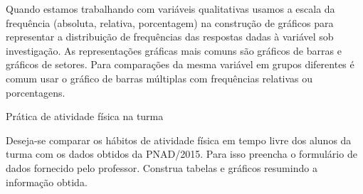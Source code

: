 \begin{observation}

Quando estamos trabalhando com variáveis qualitativas usamos a escala da frequência (absoluta, relativa, porcentagem)  na construção de gráficos para representar a distribuição de frequências das respostas dadas à variável sob investigação. As representações gráficas mais comuns são gráficos de barras e gráficos de setores. Para comparações da mesma variável em grupos diferentes é comum usar o gráfico de barras múltiplas com frequências relativas ou porcentagens.
\end{observation}

\practice{ }
\label{\detokenize{PE103-2::doc}}\label{\detokenize{PE103-2:praticando}}\label{\detokenize{PE103-2:ativ-1-pratica-atividade-fisica-na-turma}}
\begin{task}{ Prática de atividade física na turma}


Deseja-se comparar os hábitos de atividade física em tempo livre dos alunos da turma com os dados obtidos da PNAD/2015. Para isso preencha o formulário de dados fornecido pelo professor. Construa tabelas e gráficos resumindo a informação obtida.
\end{task}
\label{\detokenize{PE103-2:ativ-classificacao-de-variaveis}}
